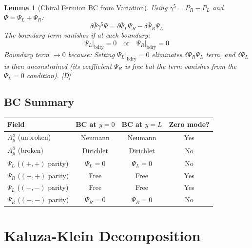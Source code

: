 \documentclass[11pt,a4paper]{article}
\newtheorem{lemma}[theorem]{Lemma}
\begin{document}
\begin{lemma}[Chiral Fermion BC from Variation]
\label{lem:ferm-bc}
Using $\gamma^5 = P_R - P_L$ and $\Psi = \Psi_L + \Psi_R$:
\begin{equation}
\delta\bar{\Psi}\gamma^5\Psi = \delta\bar{\Psi}_L \Psi_R - \delta\bar{\Psi}_R \Psi_L
\label{eq:ferm-bdry-decomp}
\end{equation}
The boundary term vanishes if at each boundary:
\begin{equation}
\boxed{\Psi_L\big|_{\text{bdry}} = 0 \quad \text{or} \quad \Psi_R\big|_{\text{bdry}} = 0}
\label{eq:chiral-bc}
\end{equation}
Boundary term $\to 0$ because: Setting $\Psi_L|_{\text{bdry}} = 0$ eliminates
$\delta\bar{\Psi}_R \Psi_L$ term, and $\delta\bar{\Psi}_L$ is then unconstrained
(its coefficient $\Psi_R$ is free but the term vanishes from the $\Psi_L = 0$ condition). [D]
\end{lemma}

\subsection{BC Summary}

\begin{center}
\begin{tabular}{lccc}
\toprule
Field & BC at $y=0$ & BC at $y=L$ & Zero mode? \\
\midrule
$A_\mu^a$ (unbroken) & Neumann & Neumann & Yes \\
$A_\mu^{\hat{a}}$ (broken) & Dirichlet & Dirichlet & No \\
$\Psi_L$ ($(+,+)$ parity) & $\Psi_L = 0$ & $\Psi_L = 0$ & No \\
$\Psi_R$ ($(+,+)$ parity) & Free & Free & Yes \\
$\Psi_L$ ($(-, -)$ parity) & Free & Free & Yes \\
$\Psi_R$ ($(-, -)$ parity) & $\Psi_R = 0$ & $\Psi_R = 0$ & No \\
\bottomrule
\end{tabular}
\end{center}

\section{Kaluza-Klein Decomposition}
\label{sec:kk}
\end{document}

